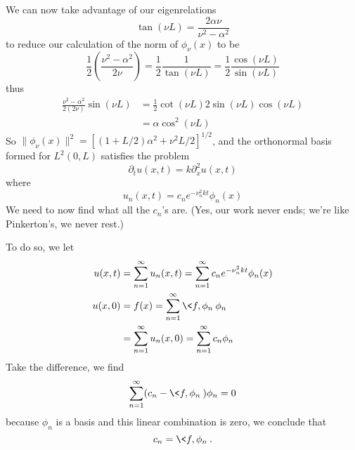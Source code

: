 We can now take advantage of our eigenrelations
\begin{equation}
\tan(\nu L) = \frac{2\alpha\nu}{\nu^2 - \alpha^2}
\end{equation}
to reduce our calculation of the norm of $\phi_{\nu}(x)$ to
be
\begin{equation}
\frac{1}{2}\left(\frac{\nu^2-\alpha^2}{2\nu}\right) =
\frac{1}{2}\frac{1}{\tan(\nu L)} = \frac{1}{2}\frac{\cos(\nu
  L)}{\sin(\nu L)}
\end{equation}
thus
\begin{subequations}
\begin{align}
\frac{\nu^2-\alpha^2}{2(2\nu)}\sin(\nu L) &=
\frac{1}{2}\cot(\nu L)2\sin(\nu L)\cos(\nu L)\\
&=\alpha\cos^{2}(\nu L)
\end{align}
\end{subequations}
So $\|\phi_{\nu}(x)\|^2 = [(1+L/2)\alpha^2 +
  \nu^2L/2]^{1/2}$, and the orthonormal basis formed for
$L^{2}(0,L)$ satisfies the problem 
\begin{equation}
\partial_{t}u(x,t) = k\partial_{x}^{2}u(x,t)
\end{equation}
where
\begin{equation}
u_{n}(x,t) = c_{n} e^{-\nu^{2}_{n}kt}\phi_{n}(x)
\end{equation}
We need to now find what all the $c_{n}$'s are. (Yes, our
work never ends; we're like Pinkerton's, we never rest.)

To do so, we let
\begin{subequations}
\begin{align}
u(x,t) &= \sum^{\infty}_{n=1}u_{n}(x,t) = \sum^{\infty}_{n=1}c_{n}e^{-\nu^{2}_{n}kt}\phi_{n}(x)\\
u(x,0)&=f(x)=\sum^{\infty}_{n=1}\<f,\phi_n\>\phi_n\\
&=\sum^{\infty}_{n=1}u_{n}(x,0)=\sum^{\infty}_{n=1}c_{n}\phi_{n}
\end{align}
\end{subequations}
Take the difference, we find
\begin{equation}
\sum^{\infty}_{n=1}(c_{n}-\<f,\phi_n\>)\phi_n=0
\end{equation}
because $\phi_n$ is a basis and this linear combination is
zero, we conclude that
\begin{equation}
c_{n} = \<f,\phi_n\>.
\end{equation}

